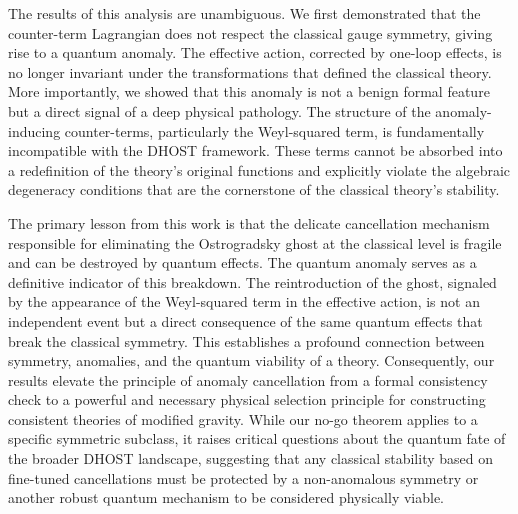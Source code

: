 \documentclass[twocolumn]{aastex631}
\begin{document}
The results of this analysis are unambiguous. We first demonstrated that the counter-term Lagrangian does not respect the classical gauge symmetry, giving rise to a quantum anomaly. The effective action, corrected by one-loop effects, is no longer invariant under the transformations that defined the classical theory. More importantly, we showed that this anomaly is not a benign formal feature but a direct signal of a deep physical pathology. The structure of the anomaly-inducing counter-terms, particularly the Weyl-squared term, is fundamentally incompatible with the DHOST framework. These terms cannot be absorbed into a redefinition of the theory's original functions and explicitly violate the algebraic degeneracy conditions that are the cornerstone of the classical theory's stability.

The primary lesson from this work is that the delicate cancellation mechanism responsible for eliminating the Ostrogradsky ghost at the classical level is fragile and can be destroyed by quantum effects. The quantum anomaly serves as a definitive indicator of this breakdown. The reintroduction of the ghost, signaled by the appearance of the Weyl-squared term in the effective action, is not an independent event but a direct consequence of the same quantum effects that break the classical symmetry. This establishes a profound connection between symmetry, anomalies, and the quantum viability of a theory. Consequently, our results elevate the principle of anomaly cancellation from a formal consistency check to a powerful and necessary physical selection principle for constructing consistent theories of modified gravity. While our no-go theorem applies to a specific symmetric subclass, it raises critical questions about the quantum fate of the broader DHOST landscape, suggesting that any classical stability based on fine-tuned cancellations must be protected by a non-anomalous symmetry or another robust quantum mechanism to be considered physically viable.

{}

\end{document}
